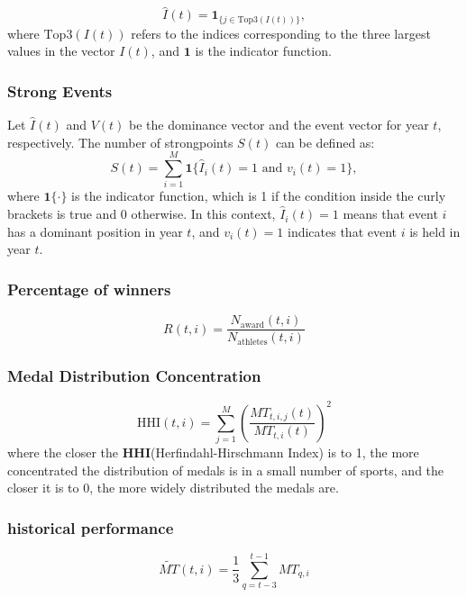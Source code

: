 \documentclass{mcmthesis}
\begin{document}
	\[\hat{I}(t) = \mathbf{1}_{\{ j \in \text{Top3}(I(t)) \}},\]
	where \( \text{Top3}(I(t)) \) refers to the indices corresponding to the three largest values in the vector \( I(t) \), and \( \mathbf{1} \) is the indicator function.
	
	
	\subsubsection{Strong Events}
	
	Let \( \hat{I}(t) \) and \( V(t) \) be the dominance vector and the event vector for year \( t \), respectively. The number of strongpoints \( S(t) \) can be defined as:
	\[
	S(t) = \sum_{i=1}^{M} \mathbf{1}\{ \hat{I}_i(t) = 1 \text{ and } v_i(t) = 1 \},
	\]
	where \( \mathbf{1}\{ \cdot \} \) is the indicator function, which is 1 if the condition inside the curly brackets is true and 0 otherwise. 
	In this context, \( \hat{I}_i(t) = 1 \) means that event \( i \) has a dominant position in year \( t \), and \( v_i(t) = 1 \) indicates that event \( i \) is held in year \( t \).
	
	
	\subsubsection{Percentage of winners}
	\[R(t,i) = \frac{N_{\text{award}}(t,i)}{N_{\text{athletes}}(t,i)}\]
	
	\subsubsection{Medal Distribution Concentration}
	\[
	\text{HHI}(t,i) = \sum_{j=1}^{M} \left( \frac{MT_{t,i,j}(t)}{MT_{t,i}(t)} \right)^2
	\]
	where the closer the \textbf{HHI}(Herfindahl-Hirschmann Index)\cite{HHI2016} is to 1, the more concentrated the distribution of medals is in a small number of sports, and the closer it is to 0, the more widely distributed the medals are.
	
	\subsubsection{historical performance}
	
	\[
	\widetilde{MT}(t,i) = \frac{1}{3} \sum_{q=t-3}^{t-1} MT_{q,i}
	\]
	
	
\end{document}
